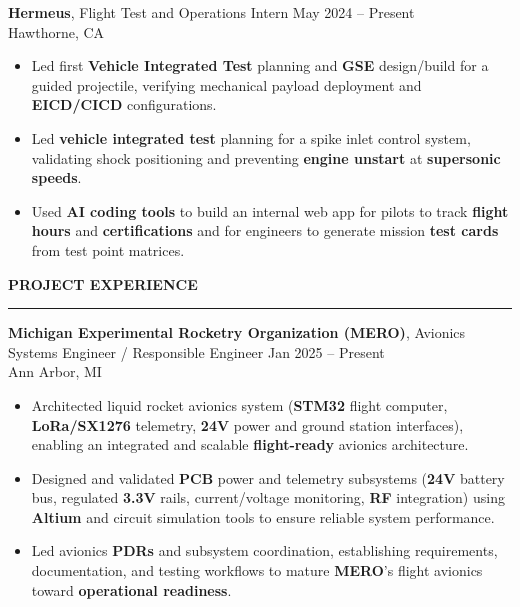 \documentclass[10pt]{article}
\newcommand{\ressection}[1]{
  \vspace{0.12em}
  {\large\bfseries #1}\par
  \vspace{0.05em}\hrule\vspace{0.12em}
}
\begin{document}
{\bfseries Hermeus}, Flight Test and Operations Intern \hfill May 2024 -- Present \\
Hawthorne, CA
\begin{itemize}
\item Led first \textbf{Vehicle Integrated Test} planning and \textbf{GSE} design/build for a guided projectile, verifying mechanical payload deployment and \textbf{EICD/CICD} configurations.
\item Led \textbf{vehicle integrated test} planning for a spike inlet control system, validating shock positioning and preventing \textbf{engine unstart} at \textbf{supersonic speeds}.
\item Used \textbf{AI coding tools} to build an internal web app for pilots to track \textbf{flight hours} and \textbf{certifications} and for engineers to generate mission \textbf{test cards} from test point matrices.
\end{itemize}

\ressection{PROJECT EXPERIENCE}

{\bfseries Michigan Experimental Rocketry Organization (MERO)}, Avionics Systems Engineer / Responsible Engineer \hfill Jan 2025 -- Present \\
Ann Arbor, MI
\begin{itemize}
\item Architected liquid rocket avionics system (\textbf{STM32} flight computer, \textbf{LoRa/SX1276} telemetry, \textbf{24V} power and ground station interfaces), enabling an integrated and scalable \textbf{flight-ready} avionics architecture.
\item Designed and validated \textbf{PCB} power and telemetry subsystems (\textbf{24V} battery bus, regulated \textbf{3.3V} rails, current/voltage monitoring, \textbf{RF} integration) using \textbf{Altium} and circuit simulation tools to ensure reliable system performance.
\item Led avionics \textbf{PDRs} and subsystem coordination, establishing requirements, documentation, and testing workflows to mature \textbf{MERO}'s flight avionics toward \textbf{operational readiness}.
\end{itemize}
\end{document}
